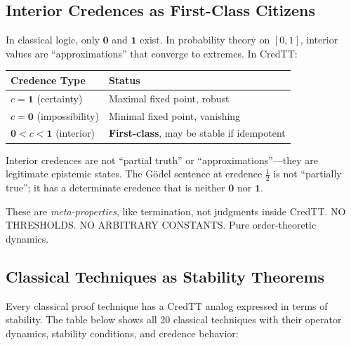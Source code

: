 \documentclass[11pt,a4paper]{article}
\newcommand{\one}{\mathbf{1}}
\newcommand{\zero}{\mathbf{0}}
\begin{document}
\subsection{Interior Credences as First-Class Citizens}

In classical logic, only $\zero$ and $\one$ exist. In probability theory on $[0,1]$, interior values are ``approximations'' that converge to extremes. In CredTT:

\begin{center}
\begin{tabular}{l|l}
\textbf{Credence Type} & \textbf{Status} \\
\hline
$c = \one$ (certainty) & Maximal fixed point, robust \\
$c = \zero$ (impossibility) & Minimal fixed point, vanishing \\
$\zero < c < \one$ (interior) & \textbf{First-class}, may be stable if idempotent \\
\end{tabular}
\end{center}

Interior credences are not ``partial truth'' or ``approximations''---they are legitimate epistemic states. The G\"odel sentence at credence $\tfrac{1}{2}$ is not ``partially true''; it has a determinate credence that is neither $\zero$ nor $\one$.

These are \emph{meta-properties}, like termination, not judgments inside CredTT. NO THRESHOLDS. NO ARBITRARY CONSTANTS. Pure order-theoretic dynamics.

\subsection{Classical Techniques as Stability Theorems}

Every classical proof technique has a CredTT analog expressed in terms of stability. The table below shows all 20 classical techniques with their operator dynamics, stability conditions, and credence behavior:
\end{document}
